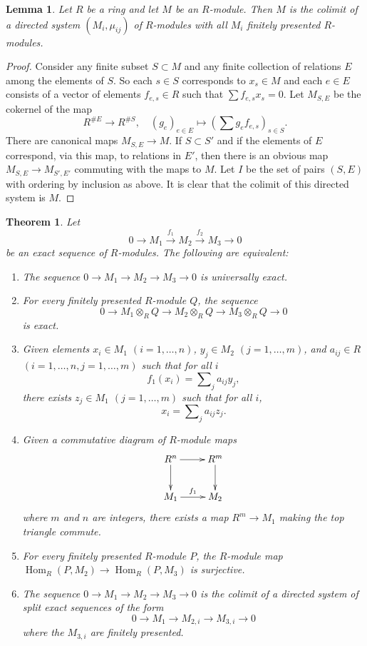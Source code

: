 \documentclass{amsart}
\theoremstyle{plain}
\newtheorem{theorem}[subsection]{Theorem}
\newtheorem{lemma}[subsection]{Lemma}
\theoremstyle{definition}
\theoremstyle{remark}
\numberwithin{equation}{subsection}
\def\Hom{\mathop{\mathrm{Hom}}\nolimits}
\begin{document}
\begin{lemma}
\label{lemma-module-colimit-fp}
Let $R$ be a ring and let $M$ be an $R$-module.
Then $M$ is the colimit of a directed system
$(M_i, \mu_{ij})$ of $R$-modules
with all $M_i$ finitely presented $R$-modules.
\end{lemma}

\begin{proof}
Consider any finite subset $S \subset M$ and any finite
collection of relations $E$ among the elements
of $S$. So each $s \in S$ corresponds to $x_s \in M$ and
each $e \in E$ consists of a vector
of elements $f_{e, s} \in R$ such that $\sum f_{e, s} x_s = 0$.
Let $M_{S, E}$ be the cokernel of the map
$$
R^{\# E} \longrightarrow R^{\# S}, \quad
(g_e)_{e\in E} \longmapsto (\sum g_e f_{e, s})_{s\in S}.
$$
There are canonical maps $M_{S, E} \to M$.
If $S \subset S'$ and if the elements of
$E$ correspond, via this map, to relations
in $E'$, then there is an obvious map
$M_{S, E} \to M_{S', E'}$ commuting with the
maps to $M$. Let $I$ be the set of pairs
$(S, E)$ with ordering by inclusion as above.
It is clear that the colimit of this directed system is $M$.
\end{proof}


\begin{theorem}
\label{theorem-universally-exact-criteria}
Let
$$
0 \to M_1 \xrightarrow{f_1} M_2 \xrightarrow{f_2} M_3 \to 0
$$
be an exact sequence of $R$-modules.  The following are equivalent:
\begin{enumerate}
\item The sequence $0 \to M_1 \to M_2 \to M_3
\to 0$ is universally exact.
\item For every finitely presented $R$-module $Q$, the sequence
$$
0 \to M_1 \otimes_R Q \to M_2 \otimes_R Q \to
M_3 \otimes_R Q \to 0
$$
is exact.
\item Given elements $x_i \in M_1$ $(i = 1, \ldots, n)$, $y_j \in M_2$ $(j = 1,
\ldots, m)$, and $a_{ij} \in R$ $(i = 1, \ldots, n, j = 1, \ldots, m)$ such that
for all $i$
$$
f_1(x_i) = \sum\nolimits_j a_{ij} y_j,
$$
there exists $z_j \in M_1$ $(j =1, \ldots, m)$ such that for all $i$,
$$
x_i = \sum\nolimits_j a_{ij} z_j .
$$
\item Given a commutative diagram of $R$-module maps
$$
\xymatrix{
R^n \ar[r] \ar[d] &  R^m \ar[d] \\
M_1 \ar[r]^{f_1}        &  M_2
}
$$
where $m$ and $n$ are integers, there exists a map $R^m \to M_1$ making
the top triangle commute.
\item For every finitely presented $R$-module $P$, the $R$-module
map $\Hom_R(P, M_2) \to \Hom_R(P, M_3)$ is surjective.
\item The sequence $0 \to M_1 \to M_2 \to M_3
\to 0$ is the colimit of a directed system of split exact sequences of
the form
$$
0 \to M_{1} \to M_{2, i} \to M_{3, i} \to 0
$$
where the $M_{3, i}$ are finitely presented.
\end{enumerate}
\end{theorem}
\end{document}
